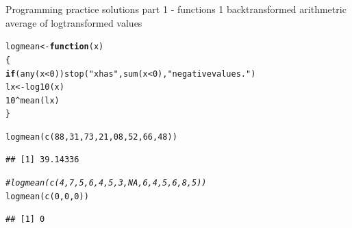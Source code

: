 \documentclass[xcolor=table,           xcolor=dvipsnames]{beamer}\usepackage[]{graphicx}\usepackage[]{color}
\makeatletter
\newcommand{\hlnum}[1]{\textcolor[rgb]{0,0,0}{#1}}
\newcommand{\hlstr}[1]{\textcolor[rgb]{0.545,0.137,0.137}{#1}}
\newcommand{\hlcom}[1]{\textcolor[rgb]{0,0.392,0}{\textit{#1}}}
\newcommand{\hlopt}[1]{\textcolor[rgb]{0,0,0}{#1}}
\newcommand{\hlstd}[1]{\textcolor[rgb]{0,0,0}{#1}}
\newcommand{\hlkwa}[1]{\textcolor[rgb]{1,0,0}{\textbf{#1}}}
\newcommand{\hlkwb}[1]{\textcolor[rgb]{0,0,0}{#1}}
\newcommand{\hlkwc}[1]{\textcolor[rgb]{1,0,1}{#1}}
\newcommand{\hlkwd}[1]{\textcolor[rgb]{0,0,1}{#1}}
\newenvironment{kframe}{%
 \def\at@end@of@kframe{}%
 \ifinner\ifhmode%
  \def\at@end@of@kframe{\end{minipage}}%
  \begin{minipage}{\columnwidth}%
 \fi\fi%
 \def\FrameCommand##1{\hskip\@totalleftmargin \hskip-\fboxsep
 \colorbox{shadecolor}{##1}\hskip-\fboxsep
     \hskip-\linewidth \hskip-\@totalleftmargin \hskip\columnwidth}%
 \MakeFramed {\advance\hsize-\width
   \@totalleftmargin\z@ \linewidth\hsize
   \@setminipage}}%
 {\par\unskip\endMakeFramed%
 \at@end@of@kframe}
\newenvironment{knitrout}{}{} %
\makeatother
\begin{document}
\begin{frame}[fragile]{Programming practice solutions part 1 - functions 1}
backtransformed arithmetric average of logtransformed values
\begin{knitrout}
\color{fgcolor}\begin{kframe}
\begin{alltt}
\hlstd{logmean} \hlkwb{<-} \hlkwa{function}\hlstd{(}\hlkwc{x}\hlstd{)}
  \hlstd{\{}
  \hlkwa{if}\hlstd{(}\hlkwd{any}\hlstd{(x}\hlopt{<}\hlnum{0}\hlstd{))} \hlkwd{stop}\hlstd{(}\hlstr{"x has "}\hlstd{,} \hlkwd{sum}\hlstd{(x}\hlopt{<}\hlnum{0}\hlstd{),} \hlstr{" negative values."}\hlstd{)}
  \hlstd{lx} \hlkwb{<-} \hlkwd{log10}\hlstd{(x)}
  \hlnum{10}\hlopt{^}\hlkwd{mean}\hlstd{(lx)}
  \hlstd{\}}

\hlkwd{logmean}\hlstd{(}\hlkwd{c}\hlstd{(}\hlnum{88}\hlstd{,}\hlnum{31}\hlstd{,}\hlnum{73}\hlstd{,}\hlnum{21}\hlstd{,}\hlnum{08}\hlstd{,}\hlnum{52}\hlstd{,}\hlnum{66}\hlstd{,}\hlnum{48}\hlstd{))}
\end{alltt}
\begin{verbatim}
## [1] 39.14336
\end{verbatim}
\begin{alltt}
\hlcom{#logmean(c(4,7,5,6,4,5,3,NA,6,4,5,6,8,5))}
\hlkwd{logmean}\hlstd{(}\hlkwd{c}\hlstd{(}\hlnum{0}\hlstd{,}\hlnum{0}\hlstd{,}\hlnum{0}\hlstd{))}
\end{alltt}
\begin{verbatim}
## [1] 0
\end{verbatim}
\end{kframe}
\end{knitrout}

\end{frame}

\end{document}
